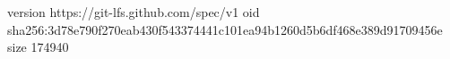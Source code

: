 version https://git-lfs.github.com/spec/v1
oid sha256:3d78e790f270eab430f543374441c101ea94b1260d5b6df468e389d91709456e
size 174940
